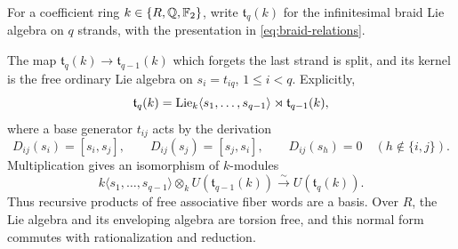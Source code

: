For a coefficient ring \(k\in\{R,\mathbb Q,{\mathbb F_2}\}\), write
\(\mathfrak t_q(k)\) for the infinitesimal braid Lie algebra on
\(q\) strands, with the presentation in \eqref{eq:braid-relations}.

\begin{lemma}\label{lem:free-fiber}
The map \(\mathfrak t_q(k)\longrightarrow\mathfrak t_{q-1}(k)\)
which forgets the last strand is split, and its kernel is the free
ordinary Lie algebra on \(s_i=t_{iq}\), \(1\leq i<q\).  Explicitly,
\begin{equation}\label{eq:free-fiber}
 \mathfrak t_q(k)
  =\operatorname{Lie}_k\langle s_1,\ldots,s_{q-1}\rangle
        \rtimes\mathfrak t_{q-1}(k),
\end{equation}
where a base generator \(t_{ij}\) acts by the derivation
\begin{equation}\label{eq:free-fiber-action}
 D_{ij}(s_i)=[s_i,s_j],\qquad
 D_{ij}(s_j)=[s_j,s_i],\qquad
 D_{ij}(s_h)=0\quad(h\notin\{i,j\}).
\end{equation}
Multiplication gives an isomorphism of \(k\)-modules
\begin{equation}\label{eq:enveloping-fiber}
 k\langle s_1,\ldots,s_{q-1}\rangle
       \otimes_k U(\mathfrak t_{q-1}(k))
       \xrightarrow{\ \sim\ }U(\mathfrak t_q(k)).
\end{equation}
Thus recursive products of free associative fiber words are a basis.
Over \(R\), the Lie algebra and its enveloping algebra are torsion
free, and this normal form commutes with rationalization and reduction.
\end{lemma}
